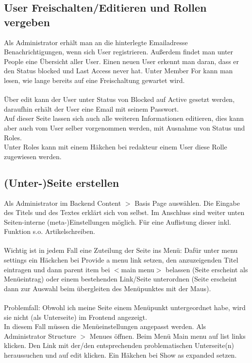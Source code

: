 \documentclass{swp}
\begin{document}
\subsection{User Freischalten/Editieren und Rollen vergeben}
Als Administrator erh\"alt man an die hinterlegte Emailadresse Benachrichtigungen, wenn sich User registrieren. Au{\ss}erdem findet man unter \glqq People\grqq{} eine \"Ubersicht aller User. Einen neuen User erkennt man daran, dass er den \glqq Status\grqq{} \glqq blocked\grqq{} und \glqq Last Access\grqq{} \glqq never\grqq{} hat. Unter \glqq Member For\grqq{} kann man lesen, wie lange bereits auf eine Freischaltung gewartet wird.\\\\
\"Uber \glqq edit\grqq{} kann der User unter \glqq Status\grqq{} von \glqq Blocked\grqq{} auf \glqq Active\grqq{} gesetzt werden, daraufhin erh\"alt der User eine Email mit seinem Passwort.\\
Auf dieser Seite lassen sich auch alle weiteren Informationen editieren, dies kann aber auch 	vom User selber vorgenommen werden, mit Ausnahme von \glqq Status\grqq{} und \glqq Roles\grqq{}.\\
Unter \glqq Roles\grqq{} kann mit einem H\"akchen bei \glqq redakteur\grqq{} einem User diese Rolle zugewiesen werden.
\subsection{(Unter-)Seite erstellen}
Als Administrator im Backend Content $>$ Basis Page ausw\"ahlen. Die Eingabe des Titels und des Textes erkl\"art sich von selbst. Im Anschluss sind weiter unten Seiten-interne (\glqq meta-\grqq{})Einstellungen m\"oglich. F\"ur eine Auflistung dieser inkl. Funktion s.o. \glqq Artikelschreiben\grqq{}.\\\\
Wichtig ist in jedem Fall eine Zuteilung der Seite ins Men\"u: Daf\"ur unter \glqq menu settings\grqq{} ein H\"ackchen bei \glqq Provide a menu link\grqq{} setzen, den anzuzeigenden Titel eintragen und dann parent item bei \glqq $<$main menu$>$\grqq{} belassen (Seite erscheint als Men\"ueintrag) oder einem bestehenden Link/Seite unterordnen (Seite erscheint dann zur Auswahl beim \"ubergleiten des Men\"upunktes mit der Maus).\\\\
Problemfall: Obwohl ich meine Seite einem Men\"upunkt untergeordnet habe, wird sie nicht (als Unterseite) im Frontend angezeigt.\\
In diesem Fall m\"ussen die Men\"ueinstellungen angepasst werden. Als Administrator Structure $>$ Menues \"offnen. Beim Men\"u \glqq Main menu\grqq{} auf \glqq list links\grqq{} klicken. Den Link mit der/den entsprechenden problematischen Unterseite(n) heraussuchen und auf \glqq edit\grqq{} klicken. Ein H\"akchen bei \glqq Show as expanded\grqq{} setzen.
\end{document}
